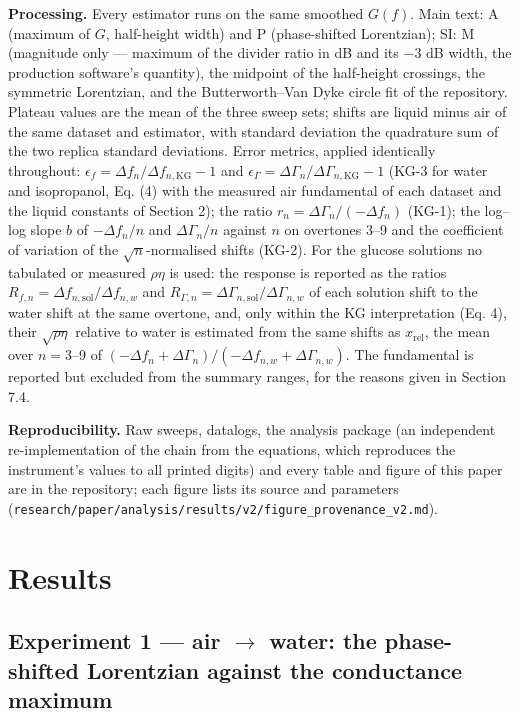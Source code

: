 \documentclass[11pt,a4paper]{article}
\begin{document}
\textbf{Processing.} Every estimator runs on the same smoothed $G(f)$. Main text: A (maximum of $G$, half-height width) and P (phase-shifted Lorentzian); SI: M (magnitude only --- maximum of the divider ratio in dB and its $-$3 dB width, the production software's quantity), the midpoint of the half-height crossings, the symmetric Lorentzian, and the Butterworth--Van Dyke circle fit of the repository. Plateau values are the mean of the three sweep sets; shifts are liquid minus air of the same dataset and estimator, with standard deviation the quadrature sum of the two replica standard deviations. Error metrics, applied identically throughout: $\epsilon_f = \Delta f_n/\Delta f_{n,\mathrm{KG}} - 1$ and $\epsilon_\Gamma = \Delta\Gamma_n/\Delta\Gamma_{n,\mathrm{KG}} - 1$ (KG-3 for water and isopropanol, Eq. (4) with the measured air fundamental of each dataset and the liquid constants of Section 2); the ratio $r_n = \Delta\Gamma_n/(-\Delta f_n)$ (KG-1); the log--log slope $b$ of $-\Delta f_n/n$ and $\Delta\Gamma_n/n$ against $n$ on overtones 3--9 and the coefficient of variation of the $\sqrt n$-normalised shifts (KG-2). For the glucose solutions no tabulated or measured $\rho\eta$ is used: the response is reported as the ratios $R_{f,n} = \Delta f_{n,\mathrm{sol}}/\Delta f_{n,w}$ and $R_{\Gamma,n} = \Delta\Gamma_{n,\mathrm{sol}}/\Delta\Gamma_{n,w}$ of each solution shift to the water shift at the same overtone, and, only within the KG interpretation (Eq. 4), their $\sqrt{\rho\eta}$ relative to water is estimated from the same shifts as $x_\mathrm{rel}$, the mean over $n = 3$--9 of $(-\Delta f_n + \Delta\Gamma_n)/(-\Delta f_{n,w} + \Delta\Gamma_{n,w})$. The fundamental is reported but excluded from the summary ranges, for the reasons given in Section 7.4.

\textbf{Reproducibility.} Raw sweeps, datalogs, the analysis package (an independent re-implementation of the chain from the equations, which reproduces the instrument's values to all printed digits) and every table and figure of this paper are in the repository; each figure lists its source and parameters (\texttt{research/paper/analysis/results/v2/figure\_provenance\_v2.md}).

\section{Results}

\subsection{Experiment 1 --- air $\rightarrow$ water: the phase-shifted Lorentzian against the conductance maximum}
\end{document}
